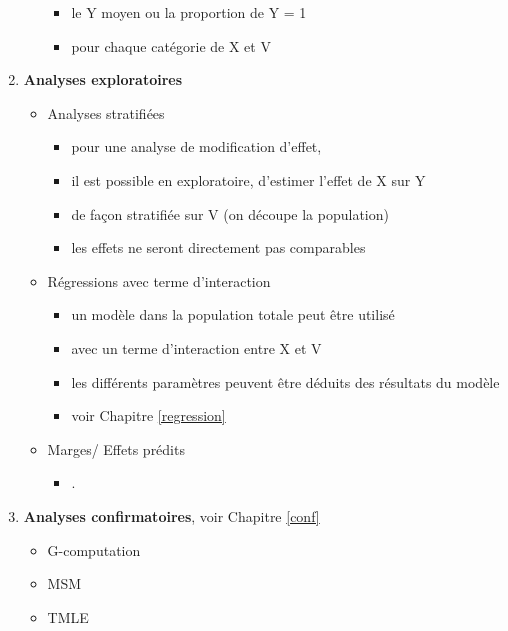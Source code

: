 \documentclass[
]{book}
\providecommand{\tightlist}{%
  \setlength{\itemsep}{0pt}\setlength{\parskip}{0pt}}
\begin{document}
\begin{enumerate}
\begin{itemize}
    \begin{itemize}
    \tightlist
    \item
      le Y moyen ou la proportion de Y = 1
    \item
      pour chaque catégorie de X et V
    \end{itemize}
  \end{itemize}
\item
  \textbf{Analyses exploratoires}

  \begin{itemize}
  \tightlist
  \item
    Analyses stratifiées

    \begin{itemize}
    \tightlist
    \item
      pour une analyse de modification d'effet,
    \item
      il est possible en exploratoire, d'estimer l'effet de X sur Y
    \item
      de façon stratifiée sur V (on découpe la population)
    \item
      les effets ne seront directement pas comparables
    \end{itemize}
  \item
    Régressions avec terme d'interaction

    \begin{itemize}
    \tightlist
    \item
      un modèle dans la population totale peut être utilisé
    \item
      avec un terme d'interaction entre X et V
    \item
      les différents paramètres peuvent être déduits des résultats du modèle
    \item
      voir Chapitre \ref{regression}
    \end{itemize}
  \item
    Marges/ Effets prédits

    \begin{itemize}
    \tightlist
    \item
      .
    \end{itemize}
  \end{itemize}
\item
  \textbf{Analyses confirmatoires}, voir Chapitre \ref{conf}

  \begin{itemize}
  \tightlist
  \item
    G-computation
  \item
    MSM
  \item
    TMLE
  \end{itemize}
\end{enumerate}
\end{document}
